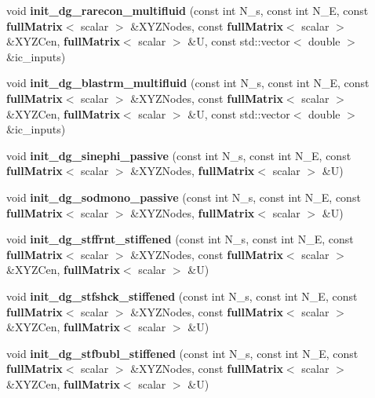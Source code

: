 \begin{DoxyCompactItemize}
\item 
void {\bfseries init\-\_\-dg\-\_\-rarecon\-\_\-multifluid} (const int N\-\_\-s, const int N\-\_\-\-E, const {\bf full\-Matrix}$<$ scalar $>$ \&X\-Y\-Z\-Nodes, const {\bf full\-Matrix}$<$ scalar $>$ \&X\-Y\-Z\-Cen, {\bf full\-Matrix}$<$ scalar $>$ \&U, const std\-::vector$<$ double $>$ \&ic\-\_\-inputs)\label{init__cond_8cc_a3972c133cc77b10a19f3fb15842b11c5}

\item 
void {\bfseries init\-\_\-dg\-\_\-blastrm\-\_\-multifluid} (const int N\-\_\-s, const int N\-\_\-\-E, const {\bf full\-Matrix}$<$ scalar $>$ \&X\-Y\-Z\-Nodes, const {\bf full\-Matrix}$<$ scalar $>$ \&X\-Y\-Z\-Cen, {\bf full\-Matrix}$<$ scalar $>$ \&U, const std\-::vector$<$ double $>$ \&ic\-\_\-inputs)\label{init__cond_8cc_aaba18aeeb40e0d19b9869ae987be559d}

\item 
void {\bfseries init\-\_\-dg\-\_\-sinephi\-\_\-passive} (const int N\-\_\-s, const int N\-\_\-\-E, const {\bf full\-Matrix}$<$ scalar $>$ \&X\-Y\-Z\-Nodes, {\bf full\-Matrix}$<$ scalar $>$ \&U)\label{init__cond_8cc_ae307850e5461da8963acc925bc36d1dc}

\item 
void {\bfseries init\-\_\-dg\-\_\-sodmono\-\_\-passive} (const int N\-\_\-s, const int N\-\_\-\-E, const {\bf full\-Matrix}$<$ scalar $>$ \&X\-Y\-Z\-Nodes, {\bf full\-Matrix}$<$ scalar $>$ \&U)\label{init__cond_8cc_ab740be91844be6cc7d9344d9165b2c36}

\item 
void {\bfseries init\-\_\-dg\-\_\-stffrnt\-\_\-stiffened} (const int N\-\_\-s, const int N\-\_\-\-E, const {\bf full\-Matrix}$<$ scalar $>$ \&X\-Y\-Z\-Nodes, const {\bf full\-Matrix}$<$ scalar $>$ \&X\-Y\-Z\-Cen, {\bf full\-Matrix}$<$ scalar $>$ \&U)\label{init__cond_8cc_a9337e2dbc52df550b2a211823b13daf0}

\item 
void {\bfseries init\-\_\-dg\-\_\-stfshck\-\_\-stiffened} (const int N\-\_\-s, const int N\-\_\-\-E, const {\bf full\-Matrix}$<$ scalar $>$ \&X\-Y\-Z\-Nodes, const {\bf full\-Matrix}$<$ scalar $>$ \&X\-Y\-Z\-Cen, {\bf full\-Matrix}$<$ scalar $>$ \&U)\label{init__cond_8cc_aace9146532de5f2d8edbf43fbb256def}

\item 
void {\bfseries init\-\_\-dg\-\_\-stfbubl\-\_\-stiffened} (const int N\-\_\-s, const int N\-\_\-\-E, const {\bf full\-Matrix}$<$ scalar $>$ \&X\-Y\-Z\-Nodes, const {\bf full\-Matrix}$<$ scalar $>$ \&X\-Y\-Z\-Cen, {\bf full\-Matrix}$<$ scalar $>$ \&U)\label{init__cond_8cc_a3b68b717c6ccb48475316b2e2e5a6ec7}


\end{DoxyCompactItemize}
